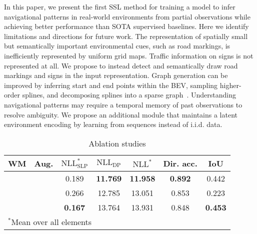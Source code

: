 \documentclass[letterpaper, 10 pt, conference]{ieeeconf}
\newcommand{\cmark}{\ding{51}}\newcommand{\xmark}{\ding{55}}\usepackage[hidelinks]{hyperref}
\begin{document}
In this paper, we present the first SSL method for training a model to infer navigational patterns in real-world environments from partial observations while achieving better performance than SOTA supervised baselines.
Here we identify limitations and directions for future work.
The representation of spatially small but semantically important environmental cues, such as road markings, is inefficiently represented by uniform grid maps. Traffic information on signs is not represented at all. We propose to instead detect and semantically draw road markings and signs in the input representation.
Graph generation can be improved by inferring start and end points within the BEV, sampling higher-order splines, and decomposing splines into a sparse graph~\cite{karlsson2021gdsla}.
Understanding navigational patterns may require a temporal memory of past observations to resolve ambiguity. We propose an additional module that maintains a latent environment encoding by learning from sequences instead of i.i.d. data.




\begin{table}[t]\caption{Ablation studies}
\vspace{-4mm}
\begin{center}
\begin{tabular}{|c|c|c|c|c|c|c|}
    \hline
     WM & Aug. & $\text{NLL}_{\text{SLP}}^{\ast}$ & $\text{NLL}_{\text{DP}}$ & $\text{NLL}^{\ast}$ & Dir. acc. & IoU \\ \hline
    \cmark & \cmark & 0.189 & \textbf{11.769} & \textbf{11.958} & \textbf{0.892} & 0.442 \\ \hline
    \xmark & \cmark & 0.266 & 12.785 & 13.051 & 0.853 & 0.223 \\ \hline
    \cmark & \xmark & \textbf{0.167} & 13.764 & 13.931 & 0.848 & \textbf{0.453} \\ \hline
   \multicolumn{6}{l}{$^{\ast}$Mean over all elements}
\end{tabular}
\label{tab:ablation_study}
\end{center}
\vspace{-3mm}
\end{table}
\end{document}
